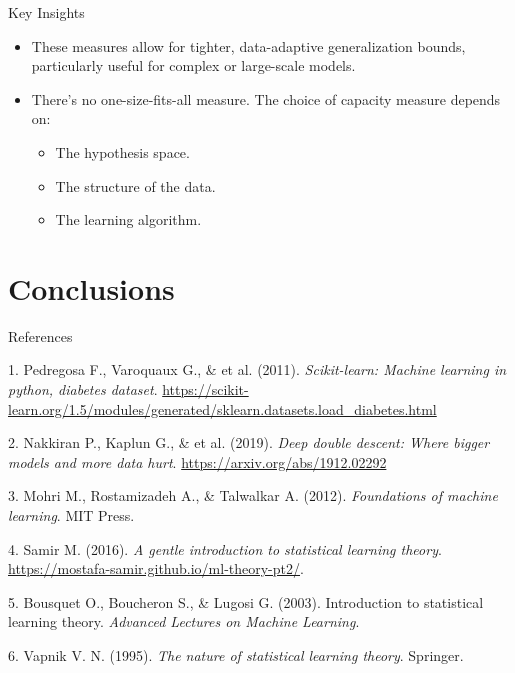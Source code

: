 \documentclass[
  ignorenonframetext,
]{beamer}
\providecommand{\tightlist}{%
  \setlength{\itemsep}{0pt}\setlength{\parskip}{0pt}}\usepackage{longtable,booktabs,array}
\newlength{\cslhangindent}
\newenvironment{CSLReferences}[2] %
 {\begin{list}{}{%
  \setlength{\itemindent}{0pt}
  \setlength{\leftmargin}{0pt}
  \setlength{\parsep}{0pt}
  \ifodd #1
   \setlength{\leftmargin}{\cslhangindent}
   \setlength{\itemindent}{-1\cslhangindent}
  \fi
  \setlength{\itemsep}{#2\baselineskip}}}
 {\end{list}}
\begin{document}
\begin{frame}
\begin{block}{Key Insights}
\label{key-insights-1}
\begin{itemize}
\tightlist
\item
  These measures allow for tighter, data-adaptive generalization bounds,
  particularly useful for complex or large-scale models.
\item
  There's no one-size-fits-all measure. The choice of capacity measure
  depends on:

  \begin{itemize}
  \tightlist
  \item
    The hypothesis space.
  \item
    The structure of the data.
  \item
    The learning algorithm.
  \end{itemize}
\end{itemize}
\end{block}
\end{frame}

\section{Conclusions}\label{conclusions}

\begin{frame}
\begin{block}{References}
\label{references}
\label{refs}
\begin{CSLReferences}{1}{0}
\footnotesize

1. Pedregosa F., Varoquaux G., \& et al. (2011). \emph{Scikit-learn:
Machine learning in python, diabetes dataset}.
\url{https://scikit-learn.org/1.5/modules/generated/sklearn.datasets.load_diabetes.html}

2. Nakkiran P., Kaplun G., \& et al. (2019). \emph{Deep double descent:
Where bigger models and more data hurt}.
\url{https://arxiv.org/abs/1912.02292}

3. Mohri M., Rostamizadeh A., \& Talwalkar A. (2012). \emph{Foundations
of machine learning}. MIT Press.

4. Samir M. (2016). \emph{A gentle introduction to statistical learning
theory}. \url{https://mostafa-samir.github.io/ml-theory-pt2/}.

5. Bousquet O., Boucheron S., \& Lugosi G. (2003). Introduction to
statistical learning theory. \emph{Advanced Lectures on Machine
Learning}.

6. Vapnik V. N. (1995). \emph{The nature of statistical learning
theory}. Springer.

\end{CSLReferences}
\end{block}
\end{frame}
\end{document}
